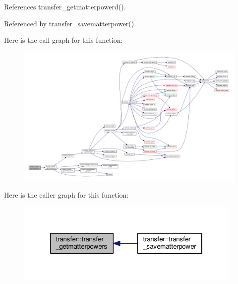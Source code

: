 References transfer\+\_\+getmatterpowerd().



Referenced by transfer\+\_\+savematterpower().

Here is the call graph for this function\+:
\nopagebreak
\begin{figure}[H]
\begin{center}
\leavevmode
\includegraphics[width=350pt]{namespacetransfer_a4515b492b259544eae13a774663d6cea_cgraph}
\end{center}
\end{figure}
Here is the caller graph for this function\+:
\nopagebreak
\begin{figure}[H]
\begin{center}
\leavevmode
\includegraphics[width=310pt]{namespacetransfer_a4515b492b259544eae13a774663d6cea_icgraph}
\end{center}
\end{figure}
\mbox{\label{namespacetransfer_a9f16a04226ffcb97b7f2bfc5b681f3b4}} 
